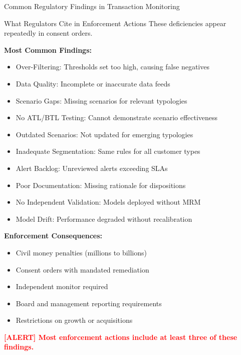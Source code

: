 \documentclass[11pt,a4paper]{beamer}
\newcommand{\redflag}[1]{\textcolor{red}{\textbf{[ALERT] #1}}}
\begin{document}
	\begin{frame}{Common Regulatory Findings in Transaction Monitoring}
	\begin{block}{What Regulators Cite in Enforcement Actions}
		These deficiencies appear repeatedly in consent orders.
	\end{block}
	
	\textbf{Most Common Findings:}
	\begin{itemize}
		\item Over-Filtering: Thresholds set too high, causing false negatives
		\item Data Quality: Incomplete or inaccurate data feeds
		\item Scenario Gaps: Missing scenarios for relevant typologies
		\item No ATL/BTL Testing: Cannot demonstrate scenario effectiveness
		\item Outdated Scenarios: Not updated for emerging typologies
		\item Inadequate Segmentation: Same rules for all customer types
		\item Alert Backlog: Unreviewed alerts exceeding SLAs
		\item Poor Documentation: Missing rationale for dispositions
		\item No Independent Validation: Models deployed without MRM
		\item Model Drift: Performance degraded without recalibration
	\end{itemize}
	
	\textbf{Enforcement Consequences:}
	\begin{itemize}
		\item Civil money penalties (millions to billions)
		\item Consent orders with mandated remediation
		\item Independent monitor required
		\item Board and management reporting requirements
		\item Restrictions on growth or acquisitions
	\end{itemize}
	
	\redflag{Most enforcement actions include at least three of these findings.}
	\end{frame}
	
\end{document}
